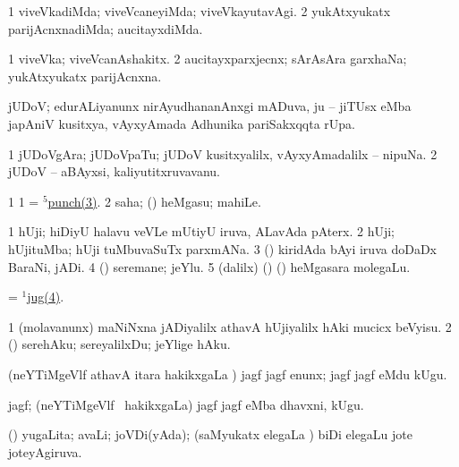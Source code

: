 \bentry
{}
\gl{\kirxvi}
\bmng
\bnum
\num{1} viveVkadiMda; viveVcaneyiMda; viveVkayutavAgi. 
\num{2} yukAtxyukatx parijAcnxnadiMda; aucitayxdiMda. 
\enum
\emng
\eentry

\bentry
{}
\gl{\nA}
\bmng
\bnum
\num{1} viveVka; viveVcanAshakitx. 
\num{2} aucitayxparxjecnx; sArAsAra garxhaNa; yukAtxyukatx parijAcnxna. 
\enum
\emng
\eentry

\bentry
{}
\gl{\nA}
\bmng
jUDoV; edurALiyanunx nirAyudhananAnxgi mADuva, ju -- jiTUsx eMba japAniV kusitxya, vAyxyAmada Adhunika pariSakxqqta rUpa. 
\emng
\eentry

\bentry
{}
\gl{\nA}
\bmng
\bnum
\num{1} jUDoVgAra; jUDoVpaTu; jUDoV kusitxyalilx, vAyxyAmadalilx -- nipuNa. 
\num{2} jUDoV -- aBAyxsi, kaliyutitxruvavanu. 
\enum
\emng
\eentry

\bentry
{}
\gl{\nA}
\bmng
\bnum
\num{1} 
\num{1} = \hyperref{kandict_p.pdf}{P}{punch(5)3}{$^5$punch(3)}. 
\num{2}  saha; (\ashi) heMgasu; mahiLe. 
\enum
\emng
\eentry

\bentry
{}
\gl{\nA}
\bmng
\bnum
\num{1} hUji; hiDiyU halavu veVLe mUtiyU iruva, ALavAda pAterx. 
\num{2} hUji; hUjituMba; hUji tuMbuvaSuTx parxmANa. 
\num{3} (\ame) kiridAda bAyi iruva doDaDx BaraNi, jADi. 
\hypertarget{jug(1)4}{} 
\num{4} (\ashi) seremane; jeYlu. 
\num{5} (\bava dalilx) (\ame) (\ashi) heMgasara molegaLu. 
\enum
\emng

\noindent
\gl{\pagu}
\bmng
{} = \hyperlink{jug(1)4}{$^1$jug(4)}. 
\emng
\eentry


\bentry
{}
\gl{\sakirx}
\bmng
\bnum
\num{1} (molavanunx) maNiNxna jADiyalilx athavA hUjiyalilx hAki mucicx beVyisu. 
\num{2} (\ashi) serehAku; sereyalilxDu; jeYlige hAku. 
\enum
\emng
\eentry


\bentry
{}
\gl{\akirx}
\bmng
(neYTiMgeVlf athavA itara hakikxgaLa \vi) jagf jagf enunx; jagf jagf eMdu kUgu. 
\emng
\eentry


\bentry
{}
\gl{\nA}
\bmng
jagf; (neYTiMgeVlf \mo\ hakikxgaLa) jagf jagf eMba dhavxni, kUgu. 
\emng
\eentry

\bentry
{}
\gl{\gu}
\bmng
(\savi) yugaLita; avaLi; joVDi(yAda); (saMyukatx elegaLa \vi) biDi elegaLu jote joteyAgiruva. 
\emng
\eentry

